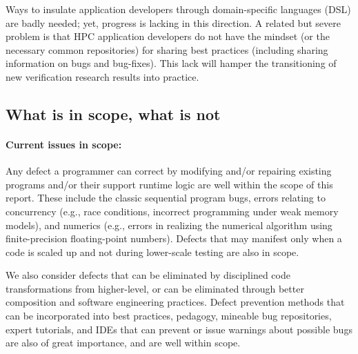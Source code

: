 Ways to insulate application developers through
domain-specific languages (DSL) are badly needed; yet,
progress is lacking in this direction.
A related but severe problem is that
HPC application developers do not have the mindset
(or the necessary common repositories) for sharing
best practices (including
  sharing information on bugs and bug-fixes).
  This lack will hamper 
the transitioning of new verification research results into practice.
  

  





\subsection{What is in scope, what is not}




\paragraph{Current issues in scope:}
%
Any defect a programmer can correct by modifying and/or repairing
existing programs and/or their support runtime logic are well within the scope of this report.
These include
the classic sequential program bugs, errors relating to concurrency
(e.g., race conditions, incorrect programming under weak memory
models), and numerics (e.g., errors in realizing the numerical
algorithm using finite-precision floating-point numbers).  Defects that may
manifest only when a code is scaled up and not  during
lower-scale testing are also in scope.

We also consider defects that can be eliminated by disciplined code
 transformations from higher-level, or can be eliminated through
 better composition and software engineering practices.  Defect
 prevention methods that can be incorporated into best practices,
 pedagogy, mineable bug repositories, expert tutorials, and IDEs that
 can prevent or issue warnings about possible bugs are also of great
 importance, and are well within scope.

  
  

